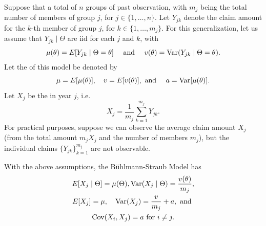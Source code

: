 \documentclass[notoc,notitlepage]{tufte-book}
\begin{document}
Suppose that a total of $n$ groups of past observation,
with $m_j$ being the total number of members of group $j$,
for $j \in \{ 1, \ldots, n \}$.
Let $Y_{jk}$ denote the claim amount for the $k$-th member of group $j$,
for $k \in \{ 1, \ldots, m_j \}$.
For this generalization, let us assume that $Y_{jk} \mid \Theta$ are iid
for each $j$ and $k$, with
\begin{equation*}
  \mu(\theta) = E[Y_{jk} \mid \Theta = \theta] \quad\text{ and }\quad
  v(\theta) = \operatorname{Var}(Y_{jk} \mid \Theta = \theta).
\end{equation*}
Let the  of this model be denoted by
\begin{equation*}
  \mu = E[\mu(\theta)],\quad v = E[v(\theta)], \text{ and }\quad
  a = \operatorname{Var}[\mu(\theta)].
\end{equation*}
Let $X_j$ be the  in year $j$,
i.e.
\begin{equation*}
  X_j = \frac{1}{m_j} \sum_{k=1}^{m_j} Y_{jk}.
\end{equation*}
For practical purposes, 
suppose we can observe the average claim amount $X_j$ (from the total amount
$m_j X_j$ and the number of members $m_j$), but the individual claims $\{ Y_{jk}
\}_{k=1}^{m_j}$ are not observable.

\begin{thm}\label{thm:buhlmann_straub_model}
  With the above assumptions, the B\"{u}hlmann-Straub Model has
  \begin{gather*}
    E[X_j \mid \Theta] = \mu(\Theta),
    \operatorname{Var}(X_j \mid \Theta) = \frac{v(\theta)}{m_j}, \\
    E[X_j] = \mu,\quad
    \operatorname{Var}(X_j) = \frac{v}{m_j} + a,\text{ and } \\
    \operatorname{Cov}(X_i, X_j) = a \text{ for } i \neq j.
  \end{gather*}
\end{thm}
\end{document}
